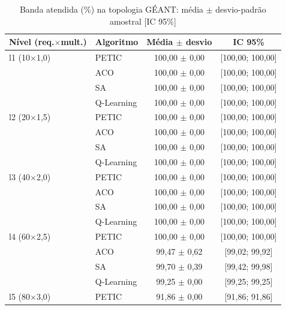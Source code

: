 \begin{table}[htb]
    \centering
    \small
    \caption{Banda atendida (\%) na topologia GÉANT: média $\pm$ desvio-padrão amostral [IC 95\%]}
    \label{tab:banda-geant}
    \begin{tabular}{llcc}
        \hline
        Nível (req.$\times$mult.) & Algoritmo & Média $\pm$ desvio & IC 95\% \\
        \hline
        l1 (10$\times$1,0) & PETIC & 100,00 $\pm$ 0,00 & [100,00; 100,00] \\
         & ACO & 100,00 $\pm$ 0,00 & [100,00; 100,00] \\
         & SA & 100,00 $\pm$ 0,00 & [100,00; 100,00] \\
         & Q-Learning & 100,00 $\pm$ 0,00 & [100,00; 100,00] \\
        \hline
        l2 (20$\times$1,5) & PETIC & 100,00 $\pm$ 0,00 & [100,00; 100,00] \\
         & ACO & 100,00 $\pm$ 0,00 & [100,00; 100,00] \\
         & SA & 100,00 $\pm$ 0,00 & [100,00; 100,00] \\
         & Q-Learning & 100,00 $\pm$ 0,00 & [100,00; 100,00] \\
        \hline
        l3 (40$\times$2,0) & PETIC & 100,00 $\pm$ 0,00 & [100,00; 100,00] \\
         & ACO & 100,00 $\pm$ 0,00 & [100,00; 100,00] \\
         & SA & 100,00 $\pm$ 0,00 & [100,00; 100,00] \\
         & Q-Learning & 100,00 $\pm$ 0,00 & [100,00; 100,00] \\
        \hline
        l4 (60$\times$2,5) & PETIC & 100,00 $\pm$ 0,00 & [100,00; 100,00] \\
         & ACO & 99,47 $\pm$ 0,62 & [99,02; 99,92] \\
         & SA & 99,70 $\pm$ 0,39 & [99,42; 99,98] \\
         & Q-Learning & 99,25 $\pm$ 0,00 & [99,25; 99,25] \\
        \hline
        l5 (80$\times$3,0) & PETIC & 91,86 $\pm$ 0,00 & [91,86; 91,86] \\

\end{tabular}
\end{table}
